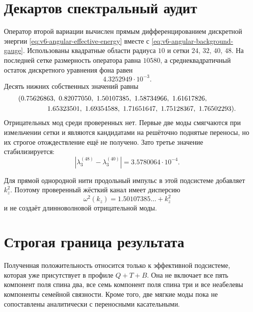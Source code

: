 \section{Декартов спектральный аудит}

Оператор второй вариации вычислен прямым дифференцированием дискретной
энергии \eqref{eq:v6-angular-effective-energy} вместе с
\eqref{eq:v6-angular-background-gauge}. Использованы квадратные области
радиуса $10$ и сетки $24$, $32$, $40$, $48$. На последней сетке
размерность оператора равна $10580$, а среднеквадратичный остаток
дискретного уравнения фона равен
\begin{equation}
 4.3252949\cdot10^{-3}.
\end{equation}
Десять нижних собственных значений равны
\begin{equation}
\begin{split}
 &(0.75626863,\ 0.82077050,\ 1.50107385,\ 1.58734966,\
 1.61617826,\\
 &\hspace{1.5cm}1.65323501,\ 1.69354588,\ 1.71651647,\
 1.75128367,\ 1.76502293).
\end{split}
\end{equation}
Отрицательных мод среди проверенных нет. Первые две моды смягчаются при
измельчении сетки и являются кандидатами на решёточно поднятые переносы,
но их строгое отождествление ещё не получено. Зато третье значение
стабилизируется:
\begin{equation}
 |\lambda_3^{(48)}-\lambda_3^{(40)}|
 =3.5780064\cdot10^{-4}.
\end{equation}

Для прямой однородной нити продольный импульс в этой подсистеме добавляет
$k_z^2$. Поэтому проверенный жёсткий канал имеет дисперсию
\begin{equation}
 \omega^2(k_z)=1.50107385\ldots+k_z^2
\end{equation}
и не создаёт длинноволновой отрицательной моды.

\section{Строгая граница результата}

Полученная положительность относится только к эффективной подсистеме,
которая уже присутствует в профиле $Q+T+B$. Она не включает все пять
компонент поля спина два, все семь компонент поля спина три и все
неабелевы компоненты семейной связности. Кроме того, две мягкие моды пока
не сопоставлены аналитически с переносными касательными.

